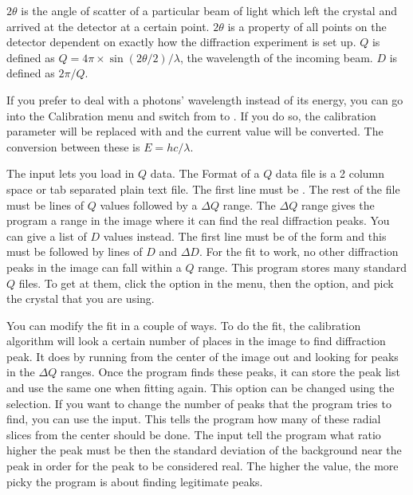 $2\theta$ is the angle of scatter of a particular beam of light 
which left the crystal and arrived at the detector at a certain 
point. $2\theta$ is a property of all points on the detector 
dependent on exactly how the diffraction experiment is set up. 
$Q$ is defined as $Q=4\pi \times \sin(2\theta/2)/\lambda$, the 
wavelength of the incoming beam. $D$ is defined as $2\pi/Q$.

If you prefer to deal with a photons' wavelength instead of its 
energy, you can go into the Calibration menu and switch from
 to . If you do so, the
calibration parameter  will be replaced with
\gui{$\lambda$:} and the current value will be converted. 
The conversion between these is $E=hc/\lambda$.

The  input lets you load in $Q$ data. The Format
of a $Q$ data file is a 2 column space or tab separated plain
text file. The first line must be . The rest of
the file must be lines of $Q$ values followed by a $\Delta Q$
range. The $\Delta Q$ range gives the program a range in the
image where it can find the real diffraction peaks. You can
give a list of $D$ values instead. The first line must be of
the form  and this must be followed by lines of
$D$ and $\Delta D$. For the fit to work, no other diffraction
peaks in the image can fall within a $Q$ range. This program
stores many standard $Q$ files. To get at them, click the 
 option in the menu, then the 
option, and pick the crystal that you are using.

You can modify the fit in a couple of ways. To do the fit,
the calibration algorithm will look a certain number of 
places in the image to find diffraction peak. It does by
running from the center of the image out and looking for
peaks in the $\Delta Q$ ranges. Once the program finds
these peaks, it can store the peak list and use the same
one when fitting again. This option can be changed using
the  selection. If
you want to change the number of peaks that the program
tries to find, you can use the  input.
This tells the program how many of these radial slices from 
the center should be done. The  input tell the 
program what ratio higher the peak must be then the standard
deviation of the background near the peak in order for the
peak to be considered real. The higher the value, the more
picky the program is about finding legitimate peaks.

